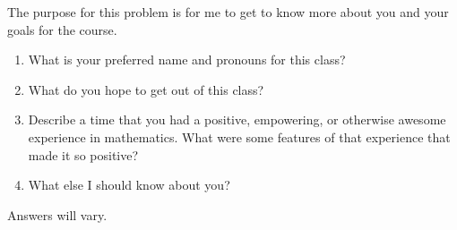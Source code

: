 \documentclass[11pt]{article}
\begin{document}
\begin{tcolorbox}[title = 5. About You]
The purpose for this problem is for me to get to know more about you and your goals for the course.

\begin{enumerate}
    \item What is your preferred name and pronouns for this class?
    \item What do you hope to get out of this class?
    \item Describe a time that you had a positive, empowering, or otherwise awesome experience in mathematics. What were some features of that experience that made it so positive?
    \item What else I should know about you?
\end{enumerate}
\end{tcolorbox}

Answers will vary.

\newpage

\end{document}
